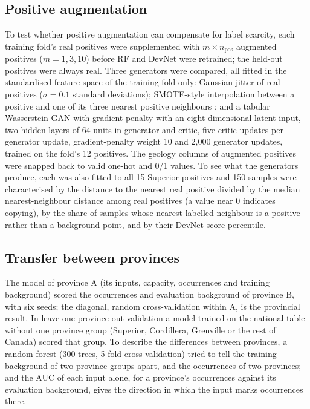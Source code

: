 \documentclass[pdflatex,sn-apa]{sn-jnl}
\begin{document}
\subsection{Positive augmentation}\label{sec:augmentation}

To test whether positive augmentation can compensate for label scarcity, each training fold's real positives were supplemented with $m \times n_{\mathrm{pos}}$ augmented positives ($m = 1, 3, 10$) before RF and DevNet were retrained; the held-out positives were always real. Three generators were compared, all fitted in the standardised feature space of the training fold only: Gaussian jitter of real positives ($\sigma = 0.1$ standard deviations); SMOTE-style interpolation between a positive and one of its three nearest positive neighbours \citep{Chawla2002}; and a tabular Wasserstein GAN with gradient penalty \citep[WGAN-GP;][]{Goodfellow2014,Arjovsky2017,Gulrajani2017} with an eight-dimensional latent input, two hidden layers of 64 units in generator and critic, five critic updates per generator update, gradient-penalty weight 10 and 2,000 generator updates, trained on the fold's 12 positives. The geology columns of augmented positives were snapped back to valid one-hot and 0/1 values. To see what the generators produce, each was also fitted to all 15 Superior positives and 150 samples were characterised by the distance to the nearest real positive divided by the median nearest-neighbour distance among real positives (a value near 0 indicates copying), by the share of samples whose nearest labelled neighbour is a positive rather than a background point, and by their DevNet score percentile.

\subsection{Transfer between provinces}\label{sec:transfer-methods}

The model of province A (its inputs, capacity, occurrences and training background) scored the occurrences and evaluation background of province B, with six seeds; the diagonal, random cross-validation within A, is the provincial result. In leave-one-province-out validation a model trained on the national table without one province group (Superior, Cordillera, Grenville or the rest of Canada) scored that group. To describe the differences between provinces, a random forest (300 trees, 5-fold cross-validation) tried to tell the training background of two province groups apart, and the occurrences of two provinces; and the AUC of each input alone, for a province's occurrences against its evaluation background, gives the direction in which the input marks occurrences there.
\end{document}
